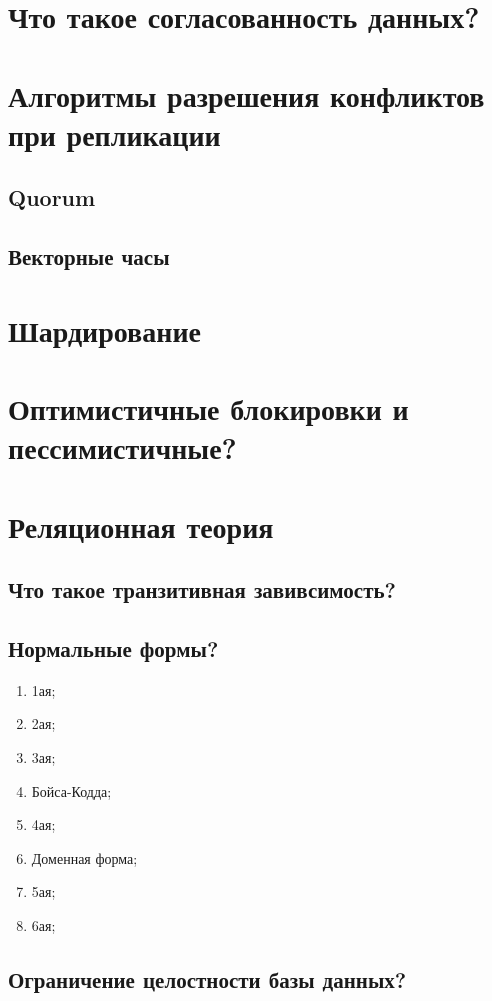\section{Что такое согласованность данных?}

\section{Алгоритмы разрешения конфликтов при репликации}
\subsection{Quorum}
\subsection{Векторные часы}

\section{Шардирование}
\section{Оптимистичные блокировки и пессимистичные?}

\section{Реляционная теория}
\subsection{Что такое транзитивная завивсимость?}
\subsection{Нормальные формы?}
\begin{enumerate}
    \item 1ая;
    \item 2ая;
    \item 3ая;
    \item Бойса-Кодда;
    \item 4ая;
    \item Доменная форма;
    \item 5ая;
    \item 6ая;
\end{enumerate}
\subsection{Ограничение целостности базы данных?}


